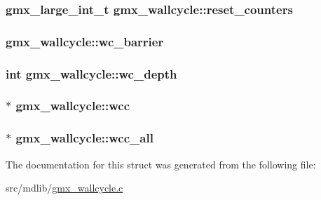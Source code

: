 \hypertarget{structgmx__wallcycle_ac36e39b69c659b87e52d6b45c288d2fa}{
\subsubsection[{reset\-\_\-counters}]{\setlength{\rightskip}{0pt plus 5cm}gmx\-\_\-large\-\_\-int\-\_\-t {\bf gmx\-\_\-wallcycle\-::reset\-\_\-counters}}}\label{structgmx__wallcycle_ac36e39b69c659b87e52d6b45c288d2fa}
\hypertarget{structgmx__wallcycle_a6f32c65f7d80fddb42abff946833120e}{
\subsubsection[{wc\-\_\-barrier}]{ {\bf gmx\-\_\-wallcycle\-::wc\-\_\-barrier}}}\label{structgmx__wallcycle_a6f32c65f7d80fddb42abff946833120e}
\hypertarget{structgmx__wallcycle_a53f1035aadc9d59b04803af8320df0fd}{
\subsubsection[{wc\-\_\-depth}]{\setlength{\rightskip}{0pt plus 5cm}int {\bf gmx\-\_\-wallcycle\-::wc\-\_\-depth}}}\label{structgmx__wallcycle_a53f1035aadc9d59b04803af8320df0fd}
\hypertarget{structgmx__wallcycle_a151a634eb4691f96485dde73ef1b00e5}{
\subsubsection[{wcc}]{$\ast$ {\bf gmx\-\_\-wallcycle\-::wcc}}}\label{structgmx__wallcycle_a151a634eb4691f96485dde73ef1b00e5}
\hypertarget{structgmx__wallcycle_a188c617723ddf101ce5da32314323b49}{
\subsubsection[{wcc\-\_\-all}]{$\ast$ {\bf gmx\-\_\-wallcycle\-::wcc\-\_\-all}}}\label{structgmx__wallcycle_a188c617723ddf101ce5da32314323b49}


\-The documentation for this struct was generated from the following file\-:\begin{DoxyCompactItemize}
\item 
src/mdlib/\hyperlink{gmx__wallcycle_8c}{gmx\-\_\-wallcycle.\-c}\end{DoxyCompactItemize}
